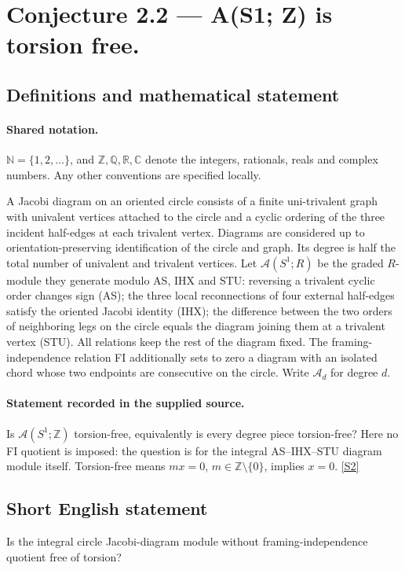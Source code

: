 \documentclass[11pt]{article}
\newcommand{\sref}[2]{\hyperlink{source:#1:#2}{[S#2]}}
\begin{document}
\section{Conjecture 2.2 — A(S1; Z) is torsion free.}\label{statement}

\subsection{Definitions and mathematical statement}

\paragraph{Shared notation.}$\mathbb N=\{1,2,\ldots\}$, and $\mathbb Z,\mathbb Q,\mathbb R,\mathbb C$ denote the integers, rationals, reals and complex numbers. Any other conventions are specified locally.


A Jacobi diagram on an oriented circle consists of a finite uni-trivalent graph with univalent vertices attached to the circle and a cyclic ordering of the three incident half-edges at each trivalent vertex. Diagrams are considered up to orientation-preserving identification of the circle and graph. Its degree is half the total number of univalent and trivalent vertices. Let $\mathcal A(S^1;R)$ be the graded $R$-module they generate modulo AS, IHX and STU: reversing a trivalent cyclic order changes sign (AS); the three local reconnections of four external half-edges satisfy the oriented Jacobi identity (IHX); the difference between the two orders of neighboring legs on the circle equals the diagram joining them at a trivalent vertex (STU). All relations keep the rest of the diagram fixed. The framing-independence relation FI additionally sets to zero a diagram with an isolated chord whose two endpoints are consecutive on the circle. Write $\mathcal A_d$ for degree $d$.
\paragraph{Statement recorded in the supplied source.}
Is $\mathcal A(S^1;\mathbb Z)$ torsion-free, equivalently is every degree piece torsion-free? Here no FI quotient is imposed: the question is for the integral AS--IHX--STU diagram module itself. Torsion-free means $m x=0$, $m\in\mathbb Z\setminus\{0\}$, implies $x=0$. \sref{statement}{2}
\subsection{Short English statement}
Is the integral circle Jacobi-diagram module without framing-independence quotient free of torsion?
\end{document}

